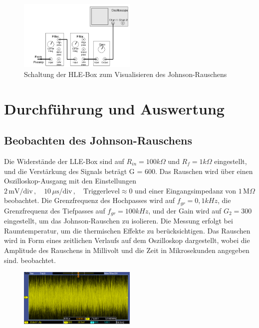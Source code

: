 \FloatBarrier
\begin{figure}[htbp]
    \centering
    \includegraphics[width=0.5\textwidth]{figs/johnson hle.png}
    \caption{Schaltung der HLE-Box zum Visualisieren des Johnson-Rauschens \cite{praktikum}}
    \label{fig:johnson hle}
\end{figure}
\FloatBarrier
\section{Durchführung und Auswertung}
\subsection{Beobachten des Johnson-Rauschens}
Die Widerstände der LLE-Box sind auf $R_{in} = 100 k\Omega$  und $R_f = 1 k\Omega$ eingestellt, und die Verstärkung des Signals beträgt G = 600. Das Rauschen wird über einen Oszilloskop-Ausgang mit den Einstellungen $2\,\text{mV/div} \,, \quad 10\,\mu\text{s/div} \,, \quad \text{Triggerlevel} \approx 0$ und einer Eingangsimpedanz von $1\,\text{M}\Omega$ beobachtet. Die Grenzfrequenz des Hochpasses wird auf $f_{gr} = 0,1 kHz$, die Grenzfrequenz des Tiefpasses auf $f_{gr} = 100 kHz$, und der Gain wird auf $G_2 = 300$ eingestellt, um das Johnson-Rauschen zu isolieren. Die Messung erfolgt bei Raumtemperatur, um die thermischen Effekte zu berücksichtigen. Das Rauschen wird in Form eines zeitlichen Verlaufs auf dem Oszilloskop dargestellt, wobei die Amplitude des Rauschens in Millivolt und die Zeit in Mikrosekunden angegeben sind.
 beobachtet. 
 \FloatBarrier
\begin{figure}[htbp]
    \centering
    \includegraphics[width=0.5\textwidth]{figs/johnson_noise_without_filter.png}
    \caption{}
    \label{fig:johnson noise}
\end{figure}
\FloatBarrier

